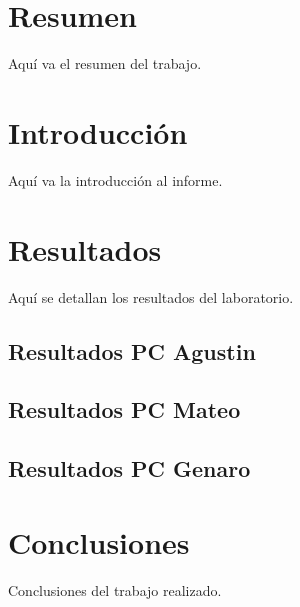 \documentclass[a4paper,12pt]{article}
\begin{document}


\section{Resumen}
Aquí va el resumen del trabajo.

\section{Introducción}
Aquí va la introducción al informe.

\newpage

\section{Resultados}
Aquí se detallan los resultados del laboratorio.

\subsection{Resultados PC Agustin}


\newpage

\subsection{Resultados PC Mateo}


\newpage

\subsection{Resultados PC Genaro}


\section{Conclusiones}
Conclusiones del trabajo realizado.
\end{document}
